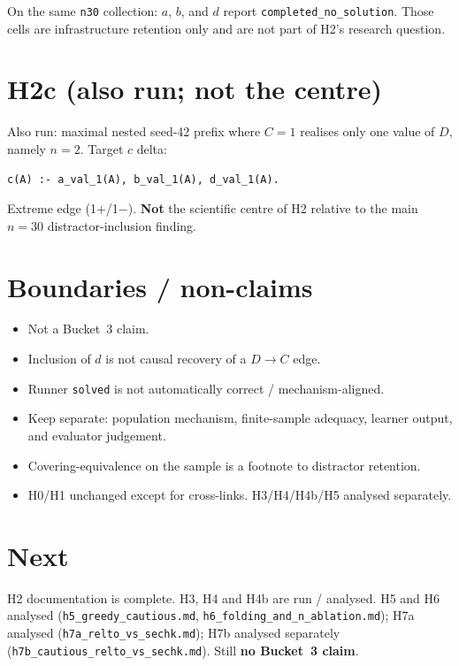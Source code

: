 \documentclass[11pt]{article}
\begin{document}
On the same \texttt{n30} collection: \(a\), \(b\), and \(d\) report
\texttt{completed\_no\_solution}.
Those cells are infrastructure retention only and are not part of H2's research
question.

\section{H2c (also run; not the centre)}

Also run: maximal nested seed-42 prefix where \(C{=}1\) realises only one value
of \(D\), namely \(n{=}2\).
Target \(c\) delta:
\begin{verbatim}
c(A) :- a_val_1(A), b_val_1(A), d_val_1(A).
\end{verbatim}
Extreme edge (1+/1$-$).
\textbf{Not} the scientific centre of H2 relative to the main \(n{=}30\)
distractor-inclusion finding.

\section{Boundaries / non-claims}

\begin{itemize}
  \item Not a Bucket~3 claim.
  \item Inclusion of \(d\) is not causal recovery of a \(D\to C\) edge.
  \item Runner \texttt{solved} is not automatically correct / mechanism-aligned.
  \item Keep separate: population mechanism, finite-sample adequacy, learner
    output, and evaluator judgement.
  \item Covering-equivalence on the sample is a footnote to distractor retention.
  \item H0/H1 unchanged except for cross-links. H3/H4/H4b/H5 analysed separately.
\end{itemize}

\section{Next}

H2 documentation is complete.
H3, H4 and H4b are run / analysed.
H5 and H6 analysed (\texttt{h5\_greedy\_cautious.md},
\texttt{h6\_folding\_and\_n\_ablation.md}); H7a analysed
(\texttt{h7a\_relto\_vs\_sechk.md}); H7b analysed separately
(\texttt{h7b\_cautious\_relto\_vs\_sechk.md}).
Still \textbf{no Bucket~3 claim}.
\end{document}
